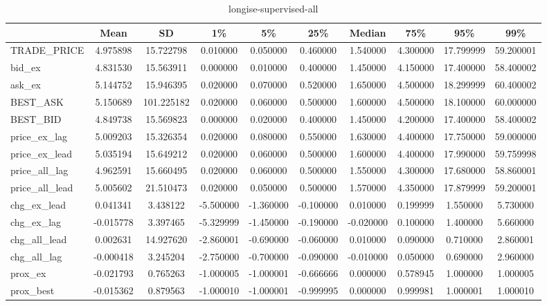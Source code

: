 \begin{table}
\centering
\caption[shortise-supervised-all]{longise-supervised-all}
\label{tab:ise-supervised-all}
\begin{tabular}{lSSSSSSSSS}
\toprule
{} & {Mean} & {SD} & {1\%} & {5\%} & {25\%} & {Median} & {75\%} & {95\%} & {99\%} \\
\midrule
TRADE\_PRICE & 4.975898 & 15.722798 & 0.010000 & 0.050000 & 0.460000 & 1.540000 & 4.300000 & 17.799999 & 59.200001 \\
bid\_ex & 4.831530 & 15.563911 & 0.000000 & 0.010000 & 0.400000 & 1.450000 & 4.150000 & 17.400000 & 58.400002 \\
ask\_ex & 5.144752 & 15.946395 & 0.020000 & 0.070000 & 0.520000 & 1.650000 & 4.500000 & 18.299999 & 60.400002 \\
BEST\_ASK & 5.150689 & 101.225182 & 0.020000 & 0.060000 & 0.500000 & 1.600000 & 4.500000 & 18.100000 & 60.000000 \\
BEST\_BID & 4.849738 & 15.569823 & 0.000000 & 0.020000 & 0.400000 & 1.450000 & 4.200000 & 17.400000 & 58.400002 \\
price\_ex\_lag & 5.009203 & 15.326354 & 0.020000 & 0.080000 & 0.550000 & 1.630000 & 4.400000 & 17.750000 & 59.000000 \\
price\_ex\_lead & 5.035194 & 15.649212 & 0.020000 & 0.060000 & 0.500000 & 1.600000 & 4.400000 & 17.990000 & 59.759998 \\
price\_all\_lag & 4.962591 & 15.660495 & 0.020000 & 0.060000 & 0.500000 & 1.550000 & 4.300000 & 17.680000 & 58.860001 \\
price\_all\_lead & 5.005602 & 21.510473 & 0.020000 & 0.050000 & 0.500000 & 1.570000 & 4.350000 & 17.879999 & 59.200001 \\
chg\_ex\_lead & 0.041341 & 3.438122 & -5.500000 & -1.360000 & -0.100000 & 0.010000 & 0.199999 & 1.550000 & 5.730000 \\
chg\_ex\_lag & -0.015778 & 3.397465 & -5.329999 & -1.450000 & -0.190000 & -0.020000 & 0.100000 & 1.400000 & 5.660000 \\
chg\_all\_lead & 0.002631 & 14.927620 & -2.860001 & -0.690000 & -0.060000 & 0.010000 & 0.090000 & 0.710000 & 2.860001 \\
chg\_all\_lag & -0.000418 & 3.245204 & -2.750000 & -0.700000 & -0.090000 & -0.010000 & 0.050000 & 0.690000 & 2.960000 \\
prox\_ex & -0.021793 & 0.765263 & -1.000005 & -1.000001 & -0.666666 & 0.000000 & 0.578945 & 1.000000 & 1.000005 \\
prox\_best & -0.015362 & 0.879563 & -1.000010 & -1.000001 & -0.999995 & 0.000000 & 0.999981 & 1.000001 & 1.000010 \\

\end{tabular}
\end{table}
